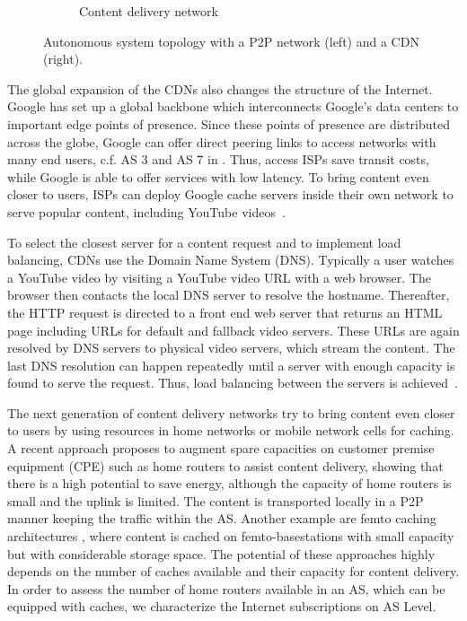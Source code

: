 \begin{figure}[bt]
\begin{subfigure}[b]{0.54\textwidth}
    \vspace{-0.5cm}
    \caption{Content delivery network}
    \label{fig:aslevel:cdn}
	\end{subfigure}
\hspace{-0.5cm}
	\caption{Autonomous system topology with a P2P network (left) and a CDN (right).}\label{fig:aslevel:p2pcdn}
\end{figure}

The global expansion of the CDNs also changes the structure of the Internet.
Google has set up a global backbone which interconnects Google's data centers to important edge points of presence.
Since these points of presence are distributed across the globe, Google can offer direct peering links to access networks with many end users, c.f. AS 3 and AS 7 in .
Thus, access ISPs save transit costs, while Google is able to offer services with low latency.
To bring content even closer to users, ISPs can deploy Google cache servers inside their own network to serve popular content, including YouTube videos~\cite{gcc}.

To select the closest server for a content request and to implement load balancing, CDNs use the Domain Name System (DNS).
Typically a user watches a YouTube video by visiting a YouTube video URL with a web browser.
The browser then contacts the local DNS server to resolve the hostname.
Thereafter, the HTTP request is directed to a front end web server that returns an HTML page including URLs for default and fallback video servers.
These URLs are again resolved by DNS servers to physical video servers, which stream the content.
The last DNS resolution can happen repeatedly until a server with enough capacity is found to serve the request.
Thus, load balancing between the servers is achieved~\cite{adhikari2012vivisecting}.

The next generation of content delivery networks try to bring content even closer to users by using resources in home networks or mobile network cells for caching.
A recent approach \cite{valancius2009greening} proposes to augment spare capacities on customer premise equipment (CPE) such as home routers to assist content delivery, showing that there is a high potential to save energy, although the capacity of home routers is small and the uplink is limited.
The content is transported locally in a P2P manner keeping the traffic within the AS.
Another example are femto caching architectures \cite{golrezaei2013femtocaching}, where content is cached on femto-basestations with small capacity but with considerable storage space.
The potential of these approaches highly depends on the number of caches available and their capacity for content delivery.
In order to assess the number of home routers available in an AS, which can be equipped with caches, we characterize the Internet subscriptions on AS Level.

